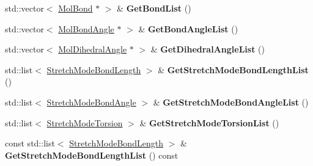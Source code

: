 \begin{DoxyCompactItemize}
\mbox{\label{class_obj_cryst_1_1_molecule_a9b009524cbe6f8e33987b3031dd10f19}} 
std\+::vector$<$ \mbox{\hyperlink{class_obj_cryst_1_1_mol_bond}{Mol\+Bond}} $\ast$ $>$ \& {\bfseries Get\+Bond\+List} ()
\item 
\mbox{\label{class_obj_cryst_1_1_molecule_a7bf589c1aebc5b3403517c9877998980}} 
std\+::vector$<$ \mbox{\hyperlink{class_obj_cryst_1_1_mol_bond_angle}{Mol\+Bond\+Angle}} $\ast$ $>$ \& {\bfseries Get\+Bond\+Angle\+List} ()
\item 
\mbox{\label{class_obj_cryst_1_1_molecule_a6933d7c4917aafc891d7241047e6d147}} 
std\+::vector$<$ \mbox{\hyperlink{class_obj_cryst_1_1_mol_dihedral_angle}{Mol\+Dihedral\+Angle}} $\ast$ $>$ \& {\bfseries Get\+Dihedral\+Angle\+List} ()
\item 
\mbox{\label{class_obj_cryst_1_1_molecule_a71b5e72c4b9b2748c507cfc8fce63dc4}} 
std\+::list$<$ \mbox{\hyperlink{struct_obj_cryst_1_1_stretch_mode_bond_length}{Stretch\+Mode\+Bond\+Length}} $>$ \& {\bfseries Get\+Stretch\+Mode\+Bond\+Length\+List} ()
\item 
\mbox{\label{class_obj_cryst_1_1_molecule_a1698daa97b88a1f9337ea446614cf666}} 
std\+::list$<$ \mbox{\hyperlink{struct_obj_cryst_1_1_stretch_mode_bond_angle}{Stretch\+Mode\+Bond\+Angle}} $>$ \& {\bfseries Get\+Stretch\+Mode\+Bond\+Angle\+List} ()
\item 
\mbox{\label{class_obj_cryst_1_1_molecule_a53ebdb2d11350831e35d369aa9a81261}} 
std\+::list$<$ \mbox{\hyperlink{struct_obj_cryst_1_1_stretch_mode_torsion}{Stretch\+Mode\+Torsion}} $>$ \& {\bfseries Get\+Stretch\+Mode\+Torsion\+List} ()
\item 
\mbox{\label{class_obj_cryst_1_1_molecule_af7c27a18e04ffb41a0bb4b36e7293c35}} 
const std\+::list$<$ \mbox{\hyperlink{struct_obj_cryst_1_1_stretch_mode_bond_length}{Stretch\+Mode\+Bond\+Length}} $>$ \& {\bfseries Get\+Stretch\+Mode\+Bond\+Length\+List} () const
\item 
\mbox{\label{class_obj_cryst_1_1_molecule_a2f1520393df31f4559725a69c7d3fa4f}} 

\end{DoxyCompactItemize}
